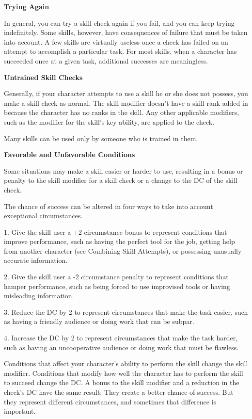 \documentclass{article}
\begin{document}
\vspace{12pt}
\textbf{Trying Again}

In general, you can try a skill check again if you fail, and you can keep trying 
indefinitely. Some skills, however, have consequences of failure that must be taken 
into account. A few skills are virtually useless once a check has failed on an 
attempt to accomplish a particular task. For most skills, when a character has 
succeeded once at a given task, additional successes are meaningless.

\vspace{12pt}
\textbf{Untrained Skill Checks}

Generally, if your character attempts to use a skill he or she does not possess, 
you make a skill check as normal. The skill modifier doesn't have a skill rank 
added in because the character has no ranks in the skill. Any other applicable 
modifiers, such as the modifier for the skill's key ability, are applied to the 
check.

Many skills can be used only by someone who is trained in them.

\vspace{12pt}
\textbf{Favorable and Unfavorable Conditions}

Some situations may make a skill easier or harder to use, resulting in a bonus 
or penalty to the skill modifier for a skill check or a change to the DC of the 
skill check.

The chance of success can be altered in four ways to take into account exceptional 
circumstances.

1. Give the skill user a +2 circumstance bonus to represent conditions that improve 
performance, such as having the perfect tool for the job, getting help from another 
character (see Combining Skill Attempts), or possessing unusually accurate information. 

2. Give the skill user a -2 circumstance penalty to represent conditions that hamper 
performance, such as being forced to use improvised tools or having misleading 
information.

3. Reduce the DC by 2 to represent circumstances that make the task easier, such 
as having a friendly audience or doing work that can be subpar.

4. Increase the DC by 2 to represent circumstances that make the task harder, such 
as having an uncooperative audience or doing work that must be flawless.

Conditions that affect your character's ability to perform the skill change the 
skill modifier. Conditions that modify how well the character has to perform the 
skill to succeed change the DC. A bonus to the skill modifier and a reduction in 
the check's DC have the same result: They create a better chance of success. But 
they represent different circumstances, and sometimes that difference is important.
\end{document}
